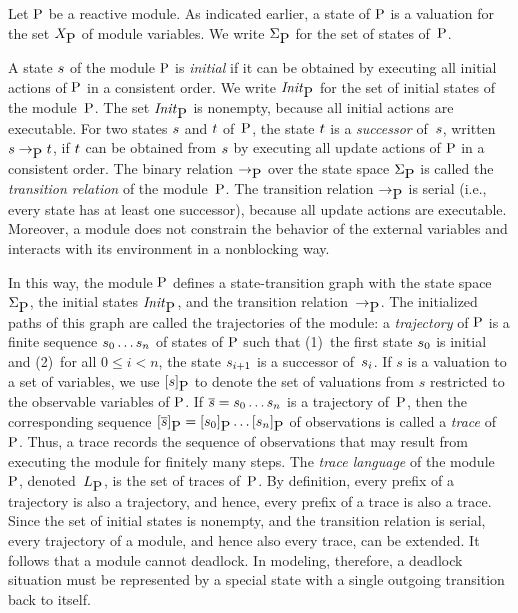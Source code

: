 Let $\mbox{P}$ be a reactive module.
As indicated earlier, a state of $\mbox{P}$ is a valuation for the set
$X_{\mbox{P}}$ of module variables.
We write $\Sigma_{\mbox{P}}$ for the set of states of~$\mbox{P}$.

\mypar
A state $s$ of the module $\mbox{P}$ is {\em initial\/} if it can be obtained
by executing all initial actions of $\mbox{P}$ in a consistent order.
We write ${\it Init}_{\mbox{P}}$ for the set of initial states of the module~$\mbox{P}$.
The set ${\it Init}_{\mbox{P}}$ is nonempty, because all initial actions are executable.
For two states $s$ and $t$ of~$\mbox{P}$, the state $t$ is a 
{\em successor\/} of~$s$, written $s\to_{\mbox{P}}t$, if 
$t$ can be obtained from $s$ by executing all update actions of 
$\mbox{P}$ in a consistent order.
The binary relation $\to_{\mbox{P}}$ over the state space $\Sigma_{\mbox{P}}$ is called
the {\em transition relation\/} of the module~$\mbox{P}$.
The transition relation $\to_{\mbox{P}}$ is serial 
(i.e., every state has at least one successor), because all update actions 
are executable.
Moreover, a module does not constrain the behavior of the external variables 
and interacts with its environment in a nonblocking way.


\mypar
In this way, the module $\mbox{P}$ defines a state-transition graph with the state
space~$\Sigma_{\mbox{P}}$, the initial states ${\it Init}_{\mbox{P}}$, and the transition 
relation~$\to_{\mbox{P}}$. 
The initialized paths of this graph are called the trajectories of the 
module:
a {\em trajectory\/} of $\mbox{P}$ is a finite sequence $s_0\ldots s_n$ 
of states of $\mbox{P}$ such that 
(1)~the first state $s_0$ is initial and
(2)~for all $0\leq i<n$, the state $s_{i+1}$ is a successor 
  of~$s_i$.
If $s$ is a valuation to a set of variables,
we use $[s]_{\mbox{P}}$ to denote the set of valuations
from $s$ restricted to the observable variables of $\mbox{P}$.
If $\overline{s}=s_0\ldots s_n$ is a trajectory of~$\mbox{P}$, then the 
corresponding sequence 
$[\overline{s}]_{\mbox{P}}=[s_0]_{\mbox{P}}\ldots[s_n]_{\mbox{P}}$ of 
observations is called a {\em trace\/} of~$\mbox{P}$.
Thus, a trace records the sequence of observations that may result from
executing the module for finitely many steps.
The {\em trace language\/} of the module~$\mbox{P}$, denoted~$L_{\mbox{P}}$, is the 
set of traces of~$\mbox{P}$.
By definition, every prefix of a trajectory is also a trajectory, and hence, 
every prefix of a trace is also a trace.
Since the set of initial states is nonempty, and the transition relation is 
serial, every trajectory of a module, and hence also every trace, can be 
extended.
It follows that a module cannot deadlock.
In modeling, therefore, a deadlock situation must be represented by a special
state with a single outgoing transition back to itself.


